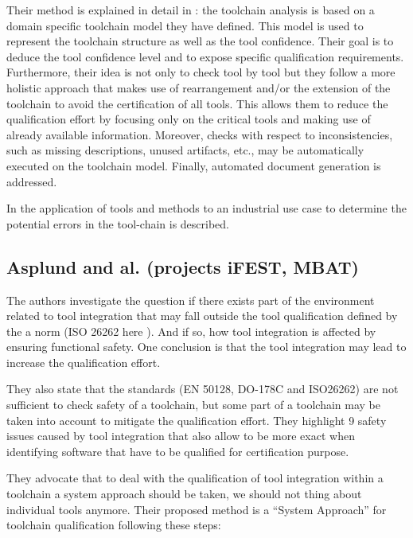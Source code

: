 Their method is explained in detail in \cite{slotosch_iso_2012}: the
toolchain analysis is based on a domain specific toolchain model
they have defined. This model is used to represent the toolchain
structure as well as the tool confidence.  Their goal is to deduce the
tool confidence level and to expose specific qualification
requirements. Furthermore, their idea is not only to check tool by
tool but they follow a more holistic approach that makes use of
rearrangement and/or the extension of the toolchain to avoid the
certification of all tools. This allows them to reduce the
qualification effort by focusing only on the critical tools and making
use of already available information.  Moreover, checks with respect to inconsistencies,
such as missing descriptions, unused artifacts, etc., may be
automatically executed on the toolchain model. Finally, automated document generation is addressed.

In \cite{wildmoser_determining_2012} the application of tools and methods to an
industrial use case to determine the potential errors in the tool-chain is described.

\subsection{Asplund and al. (projects iFEST, MBAT)}
\label{sec-1-2.2}

The authors investigate the question if there exists part of the environment related to tool
integration that may fall outside the tool qualification defined by the a norm
(ISO 26262 here \cite{asplund_qualifying_2012}). And if so, how tool integration
is affected by ensuring functional safety. One conclusion is that the tool
integration may lead to increase the qualification effort.

They also state that the standards (EN 50128, DO-178C and ISO26262)
are not sufficient to check safety of a toolchain, but some part of a
toolchain may be taken into account to mitigate the qualification
effort. 
They highlight 9 safety issues caused by tool integration that also
allow to be more exact when identifying software that have to be
qualified for certification purpose. 

They advocate that to deal with the qualification of tool integration
within a toolchain a system approach should be taken, we should not
thing about individual tools anymore.  Their proposed method is a ``System
Approach'' for toolchain qualification following these steps:

